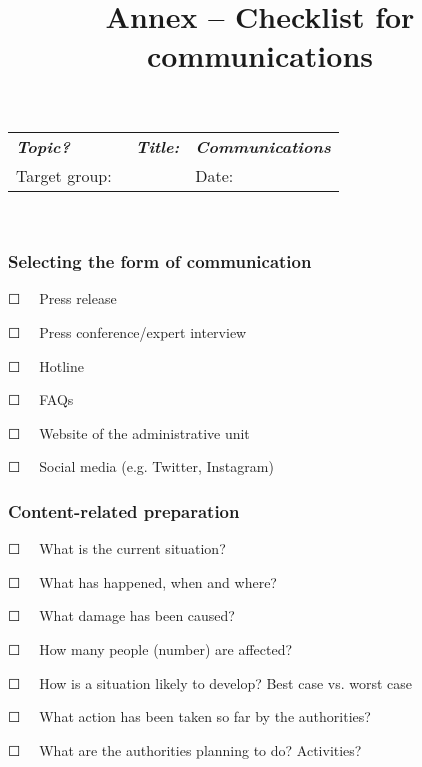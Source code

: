\documentclass{article}
\begin{document}
\title{Annex – Checklist for communications}

\maketitle





\begin{tabu} to \textwidth { |X|X|X| }
\hline



\emph{\textbf{Topic?}} & \emph{\textbf{Title:}} & \emph{\textbf{Communications}}
 \\


Target group:  &  & Date:
 \\
\hline

\end{tabu}

 


\subsubsection{Selecting the form of communication}\label{H3683887}



☐   Press release


☐   Press conference/expert interview


☐   Hotline


☐   FAQs


☐   Website of the administrative unit


☐   Social media (e.g. Twitter, Instagram) 


\subsubsection{Content-related preparation }\label{H351953}



☐   What is the current situation?


☐   What has happened, when and where?


☐   What damage has been caused?


☐   How many people (number) are affected?


☐   How is a situation likely to develop? Best case vs. worst case


☐   What action has been taken so far by the authorities?


☐   What are the authorities planning to do? Activities?
\end{document}
